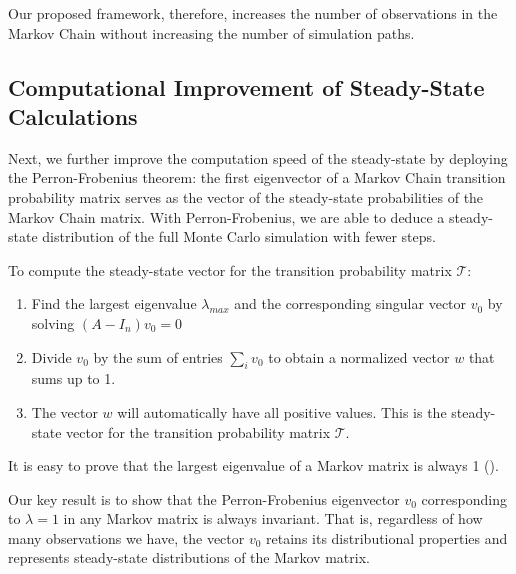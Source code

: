 \documentclass{wscpaperproc}
\theoremstyle{wsc}
\begin{document}
Our proposed framework, therefore, increases the number of observations in the Markov Chain without increasing the number of simulation paths. 

\subsection{Computational Improvement of Steady-State Calculations}

Next, we further improve the computation speed of the steady-state by deploying the Perron-Frobenius theorem: the first eigenvector of a Markov Chain transition probability matrix serves as the vector of the steady-state probabilities of the Markov Chain matrix. With Perron-Frobenius, we are able to deduce a steady-state distribution of the full Monte Carlo simulation with fewer steps. 

To compute the steady-state vector for the transition probability matrix $\mathcal{T}$:
\begin{enumerate}
    \item Find the largest eigenvalue $\lambda_{max}$ and the corresponding singular vector $v_0$ by solving $(A - I_n)v_0=0$
    \item Divide $v_0$ by the sum of entries $\sum_i v_0$ to obtain a normalized vector $w$ that sums up to 1.
    \item The vector $w$ will automatically have all positive values. This is the steady-state vector for the transition probability matrix $\mathcal{T}$. 
\end{enumerate}

It is easy to prove that the largest eigenvalue of a Markov matrix is always 1 (). 

Our key result is to show that the Perron-Frobenius eigenvector $v_0$ corresponding to $\lambda=1$ in any Markov matrix is always invariant. That is, regardless of how many observations we have, the vector $v_0$ retains its distributional properties and represents steady-state distributions of the Markov matrix.  
\end{document}
